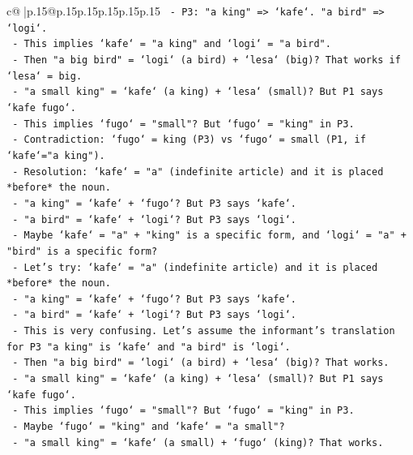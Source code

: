 \documentclass{article}
\begin{document}
{\begin{supertabular}{c@{$\;$}|p{.15\linewidth}@{}p{.15\linewidth}p{.15\linewidth}p{.15\linewidth}p{.15\linewidth}p{.15\linewidth}}
{{{\texttt{                {-} P3: "a king" => `kafe`. "a bird" => `logi`.} \\
\texttt{                {-} This implies `kafe` = "a king" and `logi` = "a bird".} \\
\texttt{                {-} Then "a big bird" = `logi` (a bird) + `lesa` (big)? That works if `lesa` = big.} \\
\texttt{                {-} "a small king" = `kafe` (a king) + `lesa` (small)? But P1 says `kafe fugo`.} \\
\texttt{                {-} This implies `fugo` = "small"? But `fugo` = "king" in P3.} \\
\texttt{                {-} Contradiction: `fugo` = king (P3) vs `fugo` = small (P1, if `kafe`="a king").} \\
\texttt{                {-} Resolution: `kafe` = "a" (indefinite article) and it is placed *before* the noun.} \\
\texttt{                  {-} "a king" = `kafe` + `fugo`? But P3 says `kafe`.} \\
\texttt{                  {-} "a bird" = `kafe` + `logi`? But P3 says `logi`.} \\
\texttt{                {-} Maybe `kafe` = "a" + "king" is a specific form, and `logi` = "a" + "bird" is a specific form?} \\
\texttt{                {-} Let's try: `kafe` = "a" (indefinite article) and it is placed *before* the noun.} \\
\texttt{                  {-} "a king" = `kafe` + `fugo`? But P3 says `kafe`.} \\
\texttt{                  {-} "a bird" = `kafe` + `logi`? But P3 says `logi`.} \\
\texttt{                {-} This is very confusing. Let's assume the informant's translation for P3 "a king" is `kafe` and "a bird" is `logi`.} \\
\texttt{                {-} Then "a big bird" = `logi` (a bird) + `lesa` (big)? That works.} \\
\texttt{                {-} "a small king" = `kafe` (a king) + `lesa` (small)? But P1 says `kafe fugo`.} \\
\texttt{                {-} This implies `fugo` = "small"? But `fugo` = "king" in P3.} \\
\texttt{                {-} Maybe `fugo` = "king" and `kafe` = "a small"?} \\
\texttt{                  {-} "a small king" = `kafe` (a small) + `fugo` (king)? That works.} \\
}}}
\end{supertabular}}
\end{document}
